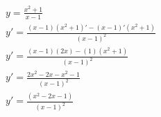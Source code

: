 \begin{ex}
\begin{align}
&y=\frac{x^2+1}{x-1}\nonumber\\
&y'=\frac{(x-1)(x^2+1)'-(x-1)'(x^2+1)}{(x-1)^2}\nonumber\\
&y'=\frac{(x-1)(2x)-(1)(x^2+1)}{(x-1)^2}\nonumber\\
&y'=\frac{2x^2-2x-x^2-1}{(x-1)^2}\nonumber\\
&y'=\frac{(x^2-2x-1)}{(x-1)^2}\nonumber
\end{align}
\end{ex}
